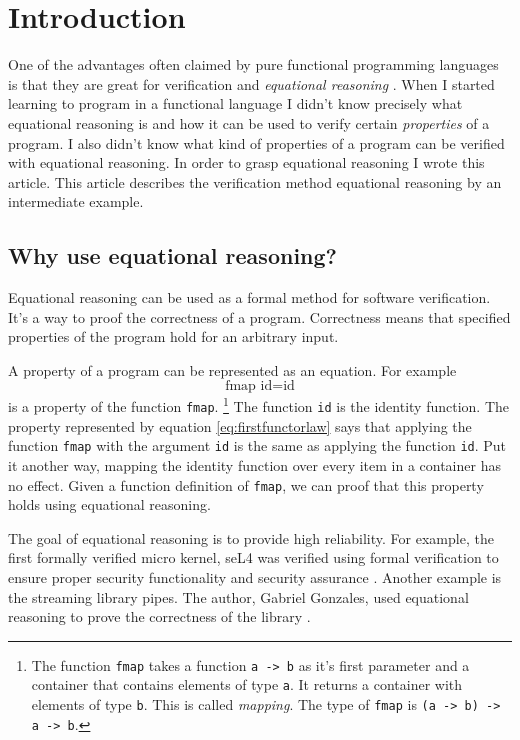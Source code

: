 \section{Introduction}
\label{sec:This}

One of the advantages often claimed by pure functional programming languages is that they are great for \gls{verification} and \emph{equational reasoning} \cite{Wadler87}.
When I started learning to program in a functional language I didn't know precisely what equational reasoning is and how it can be used to verify certain \emph{properties} of a program. I also didn't know what kind of properties of a program can be verified with equational reasoning. In order to grasp equational reasoning I wrote this article.
This article describes the verification method equational reasoning by an intermediate example. 

\subsection{Why use equational reasoning?}

Equational reasoning can be used as a formal method for software verification. It's a way to proof the correctness of a program. Correctness means that specified properties of the program hold for an arbitrary input. 

A property of a program can be represented as an equation. For example
\begin{equation}
  \label{eq:firstfunctorlaw}
\text{fmap } \text{id}  =  \text{id}  
\end{equation}
is a property of the function \verb|fmap|. \footnote{The function \verb|fmap| takes a function \verb|a -> b| as it's first parameter and a container that contains elements of type \verb|a|. It returns a container with elements of type \verb|b|. This is called \emph{mapping}. The type of \verb|fmap| is \verb|(a -> b) -> a -> b|.} The function \verb|id| is the identity function. The property represented by equation \ref{eq:firstfunctorlaw} says that applying the function \verb|fmap| with the argument \verb|id| is the same as applying the function \verb|id|. Put it another way, mapping the identity function over every item in a container has no effect. Given a function definition of \verb|fmap|, we can proof that this property holds using equational reasoning.

The goal of equational reasoning is to provide high reliability. 
For example, the first formally verified micro kernel, seL4 was verified using formal verification to ensure proper security functionality and security assurance \cite{Klein09}.
Another example is the streaming library pipes. The author, Gabriel Gonzales, used equational reasoning to prove the correctness of the library \cite{gonzales13}.

